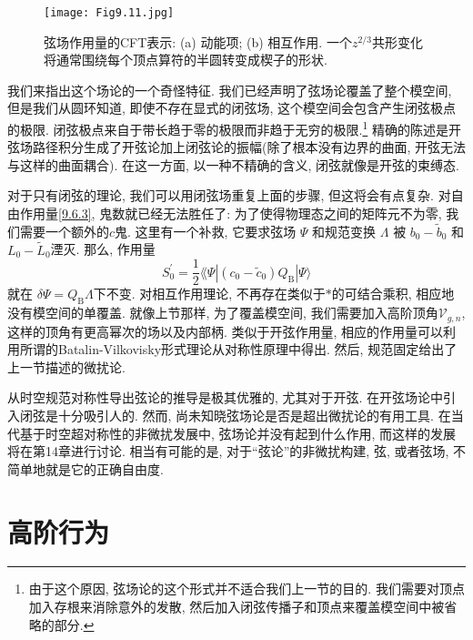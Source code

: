 \begin{figure}[h]
	\begin{center}
		\texttt{[image: Fig9.11.jpg]}\\
		\caption{弦场作用量的CFT表示: (a) 动能项; (b) 相互作用. 一个$z^{2/3}$共形变化将通常围绕每个顶点算符的半圆转变成楔子的形状.}\label{Fig9.11}
	\end{center}
\end{figure}
\vspace*{-0.7cm}

我们来指出这个场论的一个奇怪特征. 我们已经声明了弦场论覆盖了整个模空间, 但是我们从圆环知道, 即使不存在显式的闭弦场, 这个模空间会包含产生闭弦极点的极限. 
闭弦极点来自于带长趋于零的极限而非趋于无穷的极限.\footnote{由于这个原因, 弦场论的这个形式并不适合我们上一节的目的. 我们需要对顶点加入存根来消除意外的发散, 
然后加入闭弦传播子和顶点来覆盖模空间中被省略的部分.} 精确的陈述是开弦场路径积分生成了开弦论加上闭弦论的振幅(除了根本没有边界的曲面, 开弦无法与这样的曲面耦合). 
在这一方面, 以一种不精确的含义, 闭弦就像是开弦的束缚态.

对于只有闭弦的理论, 我们可以用闭弦场重复上面的步骤, 但这将会有点复杂. 对自由作用量\eqref{9.6.3}, 鬼数就已经无法胜任了: 
为了使得物理态之间的矩阵元不为零, 我们需要一个额外的$c$鬼. 这里有一个补救, 它要求弦场 $\Psi$ 和规范变换 $\Lambda$ 被 $b_{0}-\tilde{b}_{0}$ 和 $L_{0}-\tilde{L}_{0} $湮灭. 那么, 作用量
\begin{equation}
	S_{0}^{\prime}=\frac{1}{2}\lAngle\Psi |(c_{0}-\tilde{c}_{0}) Q_{\mathrm{B}}| \Psi\rangle \label{9.6.14}
\end{equation}
就在 $\delta \Psi=Q_{\mathrm{B}} \Lambda $下不变. 对相互作用理论, 不再存在类似于$*$的可结合乘积, 相应地没有模空间的单覆盖. 
就像上节那样, 为了覆盖模空间, 我们需要加入高阶顶角$\mathscr{V}_{g, n}$, 这样的顶角有更高幂次的场以及内部柄. 
类似于开弦作用量, 相应的作用量可以利用所谓的Batalin-Vilkovisky形式理论从对称性原理中得出. 然后, 规范固定给出了上一节描述的微扰论.

从时空规范对称性导出弦论的推导是极其优雅的, 尤其对于开弦. 在开弦场论中引入闭弦是十分吸引人的. 然而, 尚未知晓弦场论是否是超出微扰论的有用工具. 
在当代基于时空超对称性的非微扰发展中, 弦场论并没有起到什么作用, 而这样的发展将在第14章进行讨论. 
相当有可能的是, 对于``弦论''的非微扰构建, 弦, 或者弦场, 不简单地就是它的正确自由度.

\section{高阶行为} \label{sec:9.7} %


